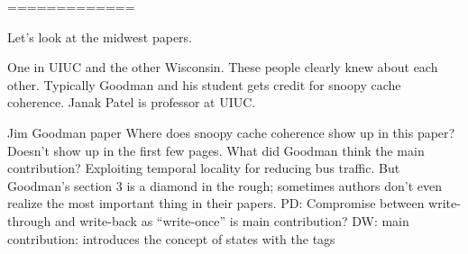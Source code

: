=============

Let's look at the midwest papers.

One in UIUC and the other Wisconsin. These people clearly knew about each other.
Typically Goodman and his student gets credit for snoopy cache coherence.
Janak Patel is professor at UIUC.

Jim Goodman paper
Where does snoopy cache coherence show up in this paper?
Doesn't show up in the first few pages.
What did Goodman think the main contribution?
Exploiting temporal locality for reducing bus traffic.
But Goodman's section 3 is a diamond in the rough; sometimes authors don't even realize the most important thing in their papers.
PD: Compromise between write-through and write-back as ``write-once'' is main contribution?
DW: main contribution: introduces the concept of states with the tags


